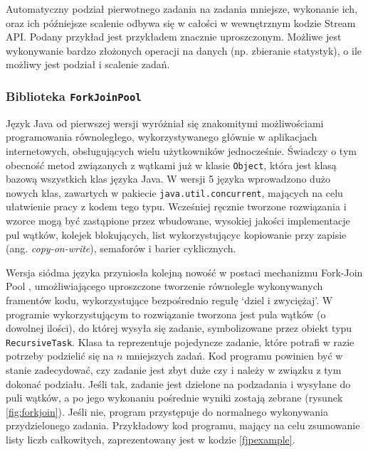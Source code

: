 \documentclass[12pt,twoside,openright]{extarticle}
\begin{document}
    Automatyczny podział pierwotnego zadania na zadania mniejsze, wykonanie ich, oraz ich późniejsze scalenie odbywa się w całości w wewnętrznym kodzie Stream API. Podany przykład jest przykładem znacznie uproszczonym. Możliwe jest wykonywanie bardzo złożonych operacji na danych (np. zbieranie statystyk), o ile możliwy jest podział i scalenie zadań.

\subsubsection{Biblioteka \texttt{ForkJoinPool}}

    Język Java od pierwszej wersji wyróżniał się znakomitymi możliwościami programowania równoległego, wykorzystywanego głównie w aplikacjach internetowych, obsługujących wielu użytkowników jednocześnie. Świadczy o tym obecność metod związanych z wątkami już w klasie \texttt{Object}, która jest klasą bazową wszystkich klas języka Java. W wersji 5 języka wprowadzono dużo nowych klas, zawartych w pakiecie \texttt{java.util.concurrent}, mających na celu ułatwienie pracy z kodem tego typu. Wcześniej ręcznie tworzone rozwiązania i wzorce mogą być zastąpione przez wbudowane, wysokiej jakości implementacje pul wątków, kolejek blokujących, list wykorzystującyc kopiowanie przy zapisie (ang. \textit{copy-on-write}), semaforów i barier cyklicznych.
    
    Wersja siódma języka przyniosła kolejną nowość w postaci mechanizmu Fork-Join Pool \cite{fjpdocs}, umożliwiającego uproszczone tworzenie równolegle wykonywanych framentów kodu, wykorzystujące bezpośrednio regułę `dziel i zwyciężaj'. W programie wykorzystującym to rozwiązanie tworzona jest pula wątków (o dowolnej ilości), do której wysyła się zadanie, symbolizowane przez obiekt typu \texttt{RecursiveTask}. Klasa ta reprezentuje pojedyncze zadanie, które potrafi w razie potrzeby podzielić się na $ n $ mniejszych zadań. Kod programu powinien być w stanie zadecydować, czy zadanie jest zbyt duże czy i należy w związku z tym dokonać podziału. Jeśli tak, zadanie jest dzielone na podzadania i wysyłane do puli wątków, a po jego wykonaniu pośrednie wyniki zostają zebrane (rysunek \ref{fig:forkjoin}). Jeśli nie, program przystępuje do normalnego wykonywania przydzielonego zadania.  Przykładowy kod programu, mający na celu zsumowanie listy liczb całkowitych, zaprezentowany jest w kodzie \ref{fjpexample}.
\end{document}
